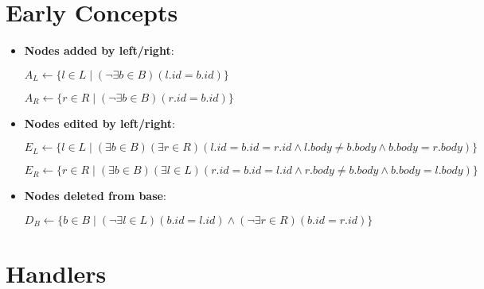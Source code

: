 \documentclass[a4paper]{article}
\begin{document}
    \section{Early Concepts}

    \begin{itemize}
        \item \textbf{Nodes added by left/right}:
        
        $A_L \leftarrow \{l \in L \mid (\lnot \exists b \in B)(l.id = b.id)\}$

        $A_R \leftarrow \{r \in R \mid (\lnot \exists b \in B)(r.id = b.id)\}$

        \item \textbf{Nodes edited by left/right}:
        
        $E_L \leftarrow \{l \in L \mid (\exists b \in B)(\exists r \in R)(l.id = b.id = r.id \land l.body \neq b.body \land b.body = r.body)\}$

        $E_R \leftarrow \{r \in R \mid (\exists b \in B)(\exists l \in L)(r.id = b.id = l.id \land r.body \neq b.body \land b.body = l.body)\}$

        \item \textbf{Nodes deleted from base}:
        
        $D_B \leftarrow \{b \in B \mid (\lnot \exists l \in L)(b.id = l.id) \land (\lnot \exists r \in R)(b.id = r.id)\}$
    \end{itemize}

    

    \section{Handlers}

    
    
    
    
    
\end{document}

